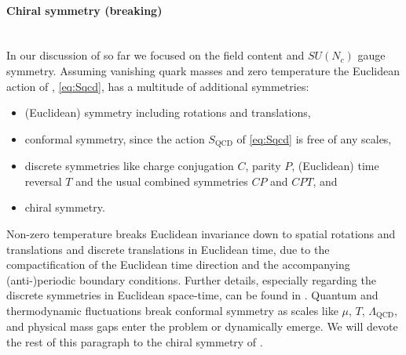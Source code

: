 \paragraph{Chiral symmetry (breaking)}\label{paragraph:qcdChiral}\mbox{}\\%
In our discussion of \qcd{} so far we focused on the field content and $SU(N_c)$ gauge symmetry. 
Assuming vanishing quark masses and zero temperature the Euclidean action of \qcd{}, \cf{} \cref{eq:Sqcd}, has a multitude of additional symmetries:
\begin{itemize}
	\item (Euclidean) \Poincare{} symmetry including rotations and translations,
	\item conformal symmetry, since the action $S_\mathrm{QCD}$ of \cref{eq:Sqcd} is free of any scales,
	\item discrete symmetries \dash{} like charge conjugation $C$, parity $P$, (Euclidean) time reversal $T$ and the usual combined symmetries $C\!P$ and $C\!PT$, and 
	\item chiral symmetry. 
\end{itemize}
Non-zero temperature breaks Euclidean \Poincare{} invariance down to spatial rotations and translations and discrete translations in Euclidean time, due to the compactification of the Euclidean time direction and the accompanying (anti-)periodic boundary conditions.
Further details, especially regarding the discrete symmetries in Euclidean space-time, can be found in .
Quantum and thermodynamic fluctuations break conformal symmetry as scales like $\mu$, $T$, $\Lambda_\mathrm{QCD}$, and physical mass gaps enter the problem or dynamically emerge.
We will devote the rest of this paragraph to the chiral symmetry of \qcd{}.\bigskip

